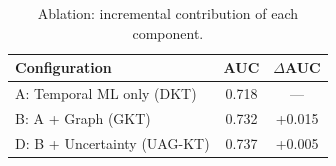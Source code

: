 \begin{table}[h]
\centering
\caption{Ablation: incremental contribution of each component.}
\label{tab:ablation}
\begin{tabular}{l|cc}
\toprule
\textbf{Configuration} & \textbf{AUC} & \textbf{$\Delta$AUC} \\
\midrule
A: Temporal ML only (DKT) & 0.718 & --- \\
B: A + Graph (GKT) & 0.732 & +0.015 \\
D: B + Uncertainty (UAG-KT) & 0.737 & +0.005 \\
\bottomrule
\end{tabular}
\end{table}
